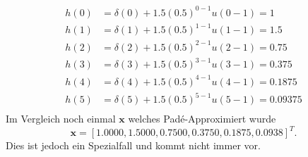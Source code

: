 \begin{beispiel}
\begin{enumerate}
\begin{align*}
h(0)&=\delta(0)+1.5(0.5)^{0-1} u(0-1)=1\\
h(1)&=\delta(1)+1.5(0.5)^{1-1} u(1-1)=1.5\\
h(2)&=\delta(2)+1.5(0.5)^{2-1} u(2-1)=0.75\\
h(3)&=\delta(3)+1.5(0.5)^{3-1} u(3-1)=0.375\\
h(4)&=\delta(4)+1.5(0.5)^{4-1} u(4-1)=0.1875\\
h(5)&=\delta(5)+1.5(0.5)^{5-1} u(5-1)=0.09375\\
\end{align*}
Im Vergleich noch einmal $\bm x$ welches Padé-Approximiert wurde
\begin{equation*}
\bm x=[1.0000 , 1.5000, 0.7500 , 0.3750 , 0.1875, 0.0938]^{T}.
\end{equation*}
Dies ist jedoch ein Spezialfall und kommt nicht immer vor.
\end{enumerate}
\end{beispiel}






